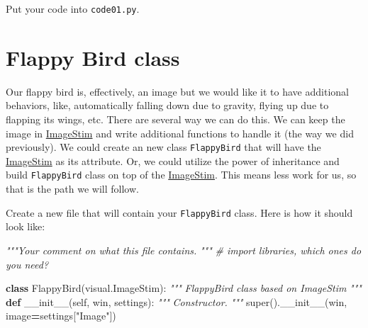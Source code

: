 \documentclass[
]{book}
\newenvironment{Shaded}{\begin{snugshade}}{\end{snugshade}}
\newcommand{\BuiltInTok}[1]{#1}
\newcommand{\CommentTok}[1]{\textcolor[rgb]{0.56,0.35,0.01}{\textit{#1}}}
\newcommand{\FunctionTok}[1]{\textcolor[rgb]{0.00,0.00,0.00}{#1}}
\newcommand{\KeywordTok}[1]{\textcolor[rgb]{0.13,0.29,0.53}{\textbf{#1}}}
\newcommand{\NormalTok}[1]{#1}
\newcommand{\OperatorTok}[1]{\textcolor[rgb]{0.81,0.36,0.00}{\textbf{#1}}}
\newcommand{\StringTok}[1]{\textcolor[rgb]{0.31,0.60,0.02}{#1}}
\newcommand{\VariableTok}[1]{\textcolor[rgb]{0.00,0.00,0.00}{#1}}
\begin{document}
Put your code into \texttt{code01.py}.

\hypertarget{flappy-bird-class}{%
\section{Flappy Bird class}\label{flappy-bird-class}}

Our flappy bird is, effectively, an image but we would like it to have additional behaviors, like, automatically falling down due to gravity, flying up due to flapping its wings, etc. There are several way we can do this. We can keep the image in \href{https://psychopy.org/api/visual/imagestim.html\#psychopy.visual.ImageStim}{ImageStim} and write additional functions to handle it (the way we did previously). We could create an new class \texttt{FlappyBird} that will have the \href{https://psychopy.org/api/visual/imagestim.html\#psychopy.visual.ImageStim}{ImageStim} as its attribute. Or, we could utilize the power of inheritance and build \texttt{FlappyBird} class on top of the \href{https://psychopy.org/api/visual/imagestim.html\#psychopy.visual.ImageStim}{ImageStim}. This means less work for us, so that is the path we will follow.

Create a new file that will contain your \texttt{FlappyBird} class. Here is how it should look like:

\begin{Shaded}
\begin{Highlighting}[]
\CommentTok{"""Your comment on what this file contains.}
\CommentTok{"""}
\CommentTok{\# import libraries, which ones do you need?}

\KeywordTok{class}\NormalTok{ FlappyBird(visual.ImageStim):}
  \CommentTok{"""}
\CommentTok{  FlappyBird class based on ImageStim}
\CommentTok{  """}
  \KeywordTok{def} \FunctionTok{\_\_init\_\_}\NormalTok{(}\VariableTok{self}\NormalTok{, win, settings):}
    \CommentTok{"""}
\CommentTok{    Constructor.}
\CommentTok{    """}
    \BuiltInTok{super}\NormalTok{().}\FunctionTok{\_\_init\_\_}\NormalTok{(win, image}\OperatorTok{=}\NormalTok{settings[}\StringTok{"Image"}\NormalTok{])}
\end{Highlighting}
\end{Shaded}
\end{document}
